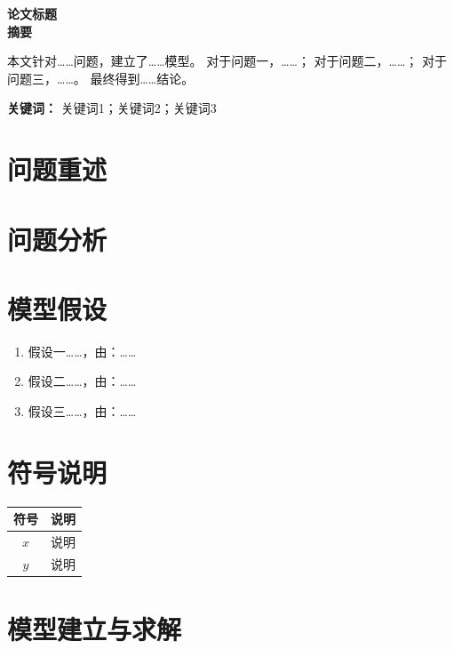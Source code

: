 \documentclass[12pt, a4paper]{article}
\begin{document}
\newpage

\newpage

\setcounter{page}{1}
\begin{center}
    {\Large \textbf{论文标题}}\\[0.5cm]
    \textbf{摘要}
\end{center}

本文针对……问题，建立了……模型。
对于问题一，……；
对于问题二，……；
对于问题三，……。
最终得到……结论。

\vspace{0.5cm}
\noindent\textbf{关键词：} 关键词1；关键词2；关键词3

\newpage


\section{问题重述}

\section{问题分析}

\section{模型假设}
\begin{enumerate}
    \item 假设一……，由：……
    \item 假设二……，由：……
    \item 假设三……，由：……
\end{enumerate}

\section{符号说明}
\begin{table}[h]
\centering
\begin{tabular}{cl}
\toprule
符号 & 说明 \\
\midrule
$x$ & 说明 \\
$y$ & 说明 \\
\bottomrule
\end{tabular}
\end{table}

\section{模型建立与求解}
\end{document}
